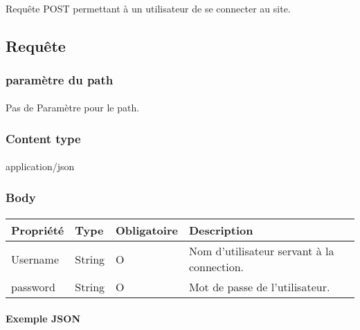 \paragraph{}
	Requête POST permettant à un utilisateur de se connecter au site.

\subsection{Requête}
	\subsubsection{paramètre du path}
		\paragraph{}
			Pas de Paramètre pour le path.
	
	\subsubsection{Content type}
		\paragraph{}
			application/json
			
	\subsubsection{Body}
		\paragraph{}
			\begin{center}
				\begin{tabularx}{\textwidth}{| T{0.2122\textwidth} | S{0.22\textwidth} | S{0.15\textwidth} | S{0.3\textwidth} |}
					\hline
					Propriété & Type & Obligatoire & Description \\
					\hline
					Username & String & O & Nom d'utilisateur servant à la connection. \\
					\hline
					password & String & O & Mot de passe de l'utilisateur. \\
					\hline
				\end{tabularx}
			\end{center}
			
		\paragraph{Exemple JSON}
